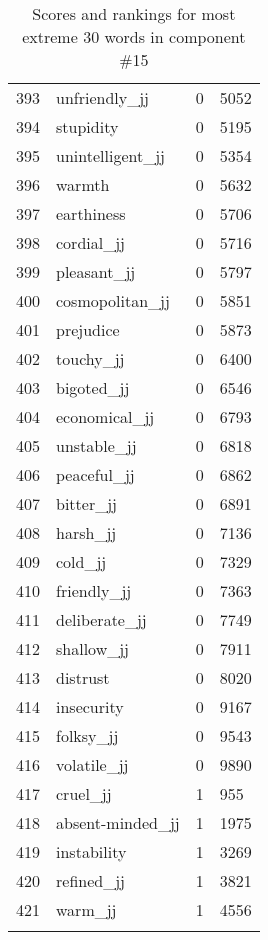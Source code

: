 \begin{longtable}[!htbp]{| rlr@{.}l |}
    393 & unfriendly\_jj & 0 & 5052 \\
    394 & stupidity & 0 & 5195 \\
    395 & unintelligent\_jj & 0 & 5354 \\
    396 & warmth & 0 & 5632 \\
    397 & earthiness & 0 & 5706 \\
    398 & cordial\_jj & 0 & 5716 \\
    399 & pleasant\_jj & 0 & 5797 \\
    400 & cosmopolitan\_jj & 0 & 5851 \\
    401 & prejudice & 0 & 5873 \\
    402 & touchy\_jj & 0 & 6400 \\
    403 & bigoted\_jj & 0 & 6546 \\
    404 & economical\_jj & 0 & 6793 \\
    405 & unstable\_jj & 0 & 6818 \\
    406 & peaceful\_jj & 0 & 6862 \\
    407 & bitter\_jj & 0 & 6891 \\
    408 & harsh\_jj & 0 & 7136 \\
    409 & cold\_jj & 0 & 7329 \\
    410 & friendly\_jj & 0 & 7363 \\
    411 & deliberate\_jj & 0 & 7749 \\
    412 & shallow\_jj & 0 & 7911 \\
    413 & distrust & 0 & 8020 \\
    414 & insecurity & 0 & 9167 \\
    415 & folksy\_jj & 0 & 9543 \\
    416 & volatile\_jj & 0 & 9890 \\
    417 & cruel\_jj & 1 & 955 \\
    418 & absent-minded\_jj & 1 & 1975 \\
    419 & instability & 1 & 3269 \\
    420 & refined\_jj & 1 & 3821 \\
    421 & warm\_jj & 1 & 4556 \\
    \hline
    \caption{Scores and rankings for most extreme 30 words in component \#15} \\
\end{longtable}
